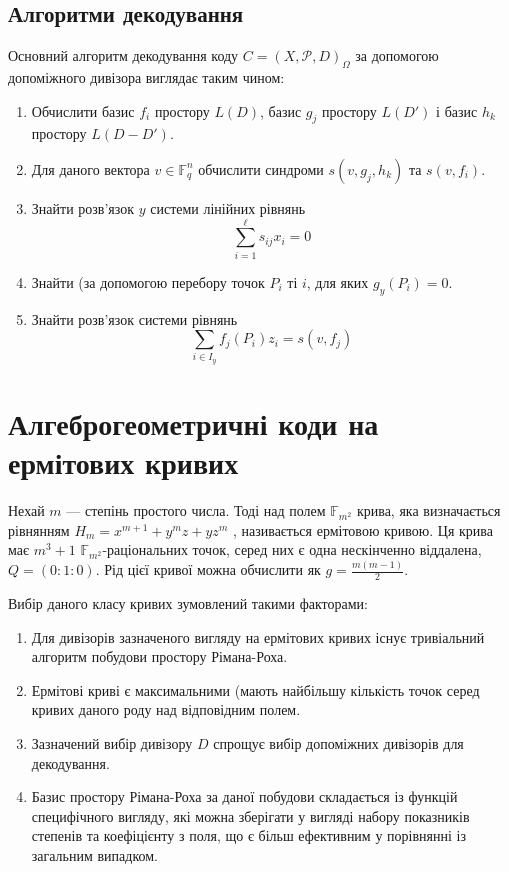 \documentclass[a4paper,14pt,oneside]{extarticle}
\begin{document}
\subsection{Алгоритми декодування}
Основний алгоритм декодування коду $C = (X, \mathcal{P}, D)_{\Omega}$ за допомогою допоміжного дивізора виглядає таким чином:
\begin{enumerate}
    \item Обчислити базис ${f_i}$ простору $L(D)$, базис ${g_j}$ простору $L(D')$ і базис ${h_k}$ простору $L(D-D')$.
    \item Для даного вектора $v \in \mathbb{F}_q^n$ обчислити синдроми $s(v, g_j, h_k)$ та $s(v, f_i)$.
    \item Знайти розв'язок $y$ системи лінійних рівнянь
        $$\sum_{i=1}^\ell s_{ij} x_i = 0$$
    \item Знайти (за допомогою перебору точок $P_i$ ті $i$, для яких $g_y(P_i) = 0$.
    \item Знайти розв'язок системи рівнянь
        $$\sum_{i \in I_y} f_j(P_i)z_i = s(v, f_j)$$
\end{enumerate}

\pagebreak
\section{Алгеброгеометричні коди на ермітових кривих}
Нехай $m$ --- степінь простого числа. Тоді над полем $\mathbb{F}_{m^2}$ крива, яка визначається рівнянням $H_m = x^{m+1} + y^m z + y z^m$ ,
називається ермітовою кривою. Ця крива має $m^3+1$ $\mathbb{F}_{m^2}$-раціональних точок, серед них є одна нескінченно віддалена, 
$Q = (0:1:0)$. Рід цієї кривої можна обчислити як $g = \frac{m(m-1)}{2}$.

Вибір даного класу кривих зумовлений такими факторами:
\begin{enumerate}
    \item Для дивізорів зазначеного вигляду на ермітових кривих існує тривіальний алгоритм побудови простору Рімана-Роха.
    \item Ермітові криві є максимальними (мають найбільшу кількість точок серед кривих даного роду над відповідним полем.
    \item Зазначений вибір дивізору $D$ спрощує вибір допоміжних дивізорів для декодування.
    \item Базис простору Рімана-Роха за даної побудови складається із функцій специфічного вигляду, які можна зберігати у вигляді набору показників степенів та 
        коефіцієнту з поля, що є більш ефективним у порівнянні із загальним випадком.
\end{enumerate}
\end{document}
